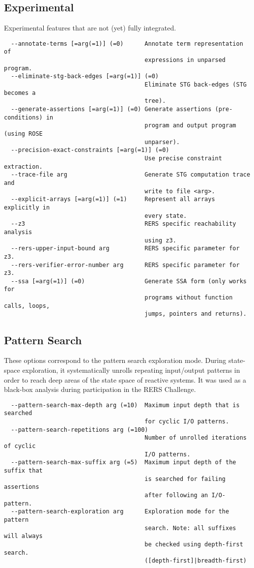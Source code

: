\documentclass[natbib]{article}
\begin{document}
\subsection{Experimental}
Experimental features that are not (yet) fully integrated.
\begin{verbatim}
  --annotate-terms [=arg(=1)] (=0)      Annotate term representation of 
                                        expressions in unparsed program.
  --eliminate-stg-back-edges [=arg(=1)] (=0)
                                        Eliminate STG back-edges (STG becomes a
                                        tree).
  --generate-assertions [=arg(=1)] (=0) Generate assertions (pre-conditions) in
                                        program and output program (using ROSE 
                                        unparser).
  --precision-exact-constraints [=arg(=1)] (=0)
                                        Use precise constraint extraction.
  --trace-file arg                      Generate STG computation trace and 
                                        write to file <arg>.
  --explicit-arrays [=arg(=1)] (=1)     Represent all arrays explicitly in 
                                        every state.
  --z3                                  RERS specific reachability analysis 
                                        using z3.
  --rers-upper-input-bound arg          RERS specific parameter for z3.
  --rers-verifier-error-number arg      RERS specific parameter for z3.
  --ssa [=arg(=1)] (=0)                 Generate SSA form (only works for 
                                        programs without function calls, loops,
                                        jumps, pointers and returns).
\end{verbatim}


\subsection{Pattern Search}
These options correspond to the pattern search exploration mode. During state-space exploration, it systematically 
unrolls repeating input/output patterns in order to reach deep areas of the state space of reactive systems. It was 
used as a black-box analysis during participation in the RERS Challenge.
\begin{verbatim}
  --pattern-search-max-depth arg (=10)  Maximum input depth that is searched 
                                        for cyclic I/O patterns.
  --pattern-search-repetitions arg (=100)
                                        Number of unrolled iterations of cyclic
                                        I/O patterns.
  --pattern-search-max-suffix arg (=5)  Maximum input depth of the suffix that 
                                        is searched for failing assertions 
                                        after following an I/O-pattern.
  --pattern-search-exploration arg      Exploration mode for the pattern 
                                        search. Note: all suffixes will always 
                                        be checked using depth-first search. 
                                        ([depth-first]|breadth-first)
\end{verbatim}
\end{document}
